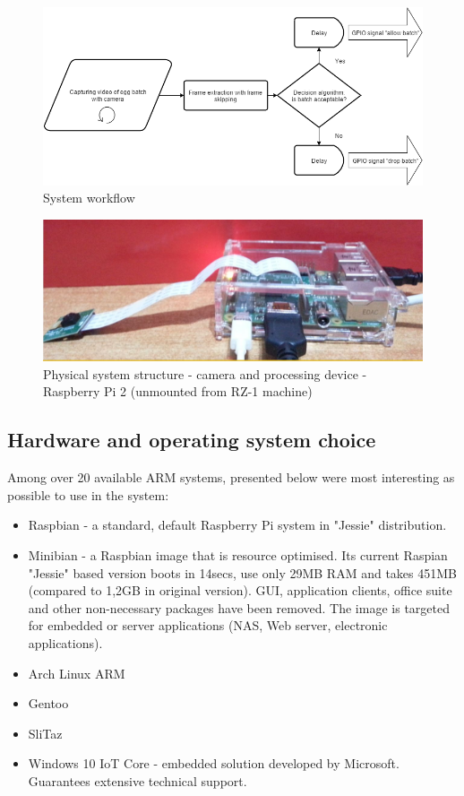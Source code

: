 \documentclass[12pt,twoside,a4paper]{article}
\begin{document}
\begin{figure}[H]
\centering
\includegraphics[width=0.8\paperwidth]{system}
\caption{System workflow}\label{fig:system}
\end{figure}

\begin{figure}[H]
\centering
\includegraphics[width=0.8\paperwidth]{phisical}
\caption{Physical system structure - camera and processing device - Raspberry Pi 2 (unmounted from RZ-1 machine)}\label{fig:phisical}
\end{figure}


\subsection{Hardware and operating system choice}

Among over 20 available ARM systems, presented below were most interesting as possible to use in the system:
\begin{itemize}
  \item Raspbian - a standard, default Raspberry Pi system in "Jessie" distribution.
  \item Minibian - a Raspbian image that is resource optimised.
  Its current Raspian "Jessie" based version boots in 14secs, use only 29MB RAM and takes 451MB (compared to 1,2GB in original version). GUI, application clients, office suite and other non-necessary packages have been removed. The image is targeted for embedded or server applications (NAS, Web server, electronic applications).
  \item Arch Linux ARM
  \item Gentoo
  \item SliTaz
  \item Windows 10 IoT Core - embedded solution developed by Microsoft. Guarantees extensive technical support.
\end{itemize}
\end{document}
